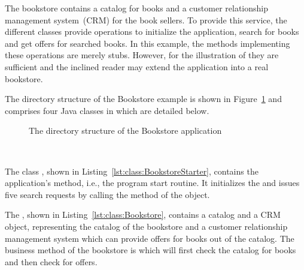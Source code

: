 The bookstore contains a catalog for books and a customer relationship %
management system~(CRM) for the book sellers. To provide this service, the different classes %
provide operations to initialize the application, search for books and get offers %
for searched books. In this example, the methods implementing these operations are %
merely stubs. However, for the illustration of \Kieker{} they are sufficient and the %
inclined reader may extend the application into a real bookstore. 

The directory structure of the Bookstore example is shown in %
Figure~\ref{fig:PlainBookstoreExample} and comprises four Java classes in %
 which are detailed below.

\begin{figure}[H]
\begin{graybox}
\end{graybox}

\caption{The directory structure of the Bookstore application}
\label{fig:PlainBookstoreExample}
\end{figure}


\quad\

\noindent The class , shown in Listing~\ref{lst:class:BookstoreStarter}, %
contains the application's  method, i.e., the program start routine. It initializes the  and issues five search requests by %
calling the  method of the  object.

\setJavaCodeListing



\noindent The , shown in Listing~\ref{lst:class:Bookstore}, contains a catalog and a CRM object, representing the catalog of the bookstore and a customer relationship management system which can provide offers for books out of the catalog. The business method of the bookstore is  which will first check the catalog for books and then check for offers.

